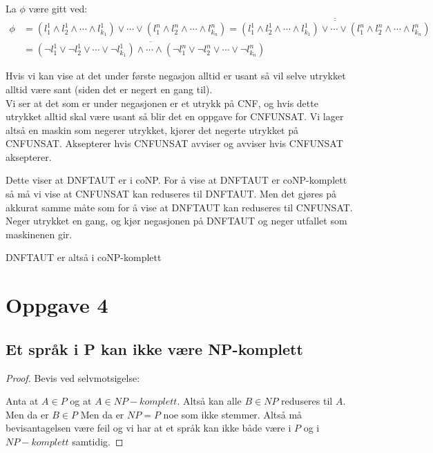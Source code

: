 \documentclass{article}
\begin{document}
La $\phi$ være gitt ved:
\begin{align*}
  \phi &= (l_1^1 \land l_2^1 \land \cdots \land l_{k_1}^1)\lor \cdots \lor (l_1^n \land l_2^n \land \cdots \land l_{k_n}^n) = \overline{\overline{(l_1^1 \land l_2^1 \land \cdots \land l_{k_1}^1)\lor \cdots \lor (l_1^n \land l_2^n \land \cdots \land l_{k_n}^n)}} \\
  &= \overline{(\neg l_1^1 \lor \neg l_2^1 \lor \cdots \lor \neg l_{k_1}^1)\land \cdots \land (\neg l_1^n \lor \neg l_2^n \lor \cdots \lor \neg l_{k_n}^n)}
\end{align*}


Hvis vi kan vise at det under første negasjon alltid er usant så vil selve utrykket alltid være sant (siden det er negert en gang til).\\
Vi ser at det som er under negasjonen er et utrykk på CNF, og hvis dette utrykket alltid skal være usant så blir det en oppgave for CNFUNSAT.
Vi lager altså en maskin som negerer utrykket, kjører det negerte utrykket på CNFUNSAT. Aksepterer hvis CNFUNSAT avviser og avviser hvis CNFUNSAT aksepterer.

Dette viser at DNFTAUT er i coNP. For å vise at DNFTAUT er coNP-komplett så må vi vise at CNFUNSAT kan reduseres til DNFTAUT. Men det gjøres på akkurat samme måte som for å vise at DNFTAUT kan reduseres til CNFUNSAT. Neger utrykket en gang, og kjør negasjonen på DNFTAUT og neger utfallet som maskinenen gir.

DNFTAUT er altså i coNP-komplett


\section*{Oppgave 4}

\subsection*{Et språk i P kan ikke være NP-komplett}
\begin{proof}
Bevis ved selvmotsigelse:

Anta at $A \in P$ og at $A \in NP-komplett$. Altså kan alle $B \in NP$ reduseres til $A$. Men da er $B \in P$ Men da er $NP = P$ noe som ikke stemmer. Altså må bevisantagelsen være feil og vi har at et språk kan ikke både være i $P $ og i $NP-komplett$ samtidig.

\end{proof}
\end{document}
